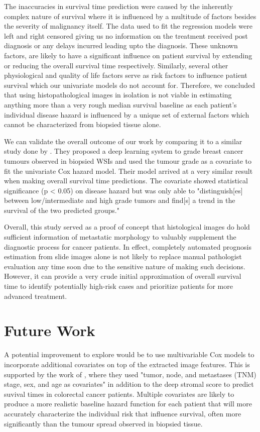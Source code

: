 \documentclass{l4proj}
\begin{document}
The inaccuracies in survival time prediction were caused by the inherently complex nature of survival where it is influenced by a multitude of factors besides the severity of malignancy itself. The data used to fit the regression models were left and right censored giving us no information on the treatment received post diagnosis or any delays incurred leading upto the diagnosis. These unknown factors, are likely to have a significant influence on patient survival by extending or reducing the overall survival time respectively. Similarly, several other physiological and quality of life factors serve as risk factors to influence patient survival which our univariate models do not account for. Therefore, we concluded that using histopathological images in isolation is not viable in estimating anything more than a very rough median survival baseline as each patient's individual disease hazard is influenced by a unique set of external factors which cannot be characterized from biopsied tissue alone. 

We can validate the overall outcome of our work by comparing it to a similar study done by \cite{Wetstein2022}. They proposed a deep learning system to grade breast cancer tumours observed in biopsied WSIs and used the tumour grade as a covariate to fit the univariate Cox hazard model. Their model arrived at a very similar result when making overall survival time predictions. The covariate showed statistical significance (p < 0.05) on disease hazard but was only able to "distinguish[es] between low/intermediate and high grade tumors and find[s] a trend in the survival of the two predicted groups." 

 Overall, this study served as a proof of concept that histological images do hold sufficient information of metastatic morphology to valuably supplement the diagnostic process for cancer patients. In effect, completely automated prognosis estimation from slide images alone is not likely to replace manual pathologist evaluation any time soon due to the sensitive nature of making such decisions. However, it can provide a very crude initial approximation of overall survival time to identify potentially high-risk cases and prioritize patients for more advanced treatment.


\section{Future Work}
A potential improvement to explore would be to use multivariable Cox models to incorporate additional covariates on top of the extracted image features. This is supported by the work of \cite{Kather2019}, where they used  "tumor, node, and metastases (TNM) stage, sex, and age as covariates" in addition to the deep stromal score to predict suvival times in colorectal cancer patients. Multiple covariates are likely to produce a more realistic baseline hazard function for each patient that will more accurately characterize the individual risk that influence survival, often more significantly than the tumour spread observed in biopsied tissue. 
\end{document}
